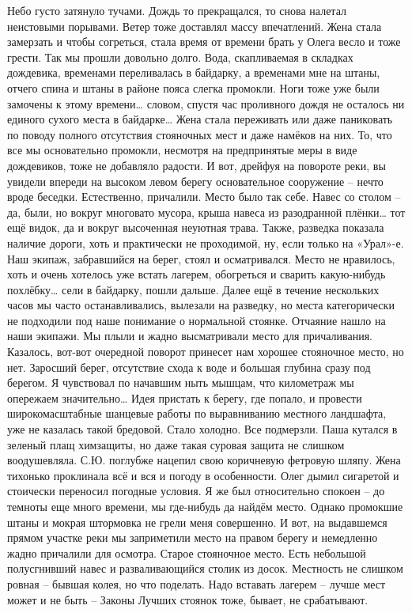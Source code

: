 Небо густо затянуло тучами. Дождь то прекращался, то снова налетал неистовыми порывами. Ветер тоже доставлял массу впечатлений. Жена стала замерзать и чтобы согреться, стала время от времени брать у Олега весло и тоже грести. Так мы прошли довольно долго. Вода, скапливаемая в складках дождевика, временами переливалась в байдарку, а временами мне на штаны, отчего спина и штаны в районе пояса слегка промокли. Ноги тоже уже были замочены к этому времени… словом, спустя час проливного дождя не осталось ни единого сухого места в байдарке… Жена стала переживать или даже паниковать по поводу полного отсутствия стояночных мест и даже намёков на них. То, что все мы основательно промокли, несмотря на предпринятые меры в виде дождевиков, тоже не добавляло радости.
И вот, дрейфуя на повороте реки, вы увидели впереди на высоком левом берегу основательное сооружение – нечто вроде беседки. Естественно, причалили. Место было так себе. Навес со столом – да, были, но вокруг многовато мусора, крыша навеса из разодранной плёнки… тот ещё видок, да и вокруг высоченная неуютная трава. Также, разведка показала наличие дороги, хоть и практически не проходимой, ну, если только на «Урал»-е. Наш экипаж, забравшийся на берег, стоял и осматривался. Место не нравилось, хоть и очень хотелось уже встать лагерем, обогреться и сварить какую-нибудь похлёбку… сели в байдарку, пошли дальше.
Далее ещё в течение нескольких часов мы часто останавливались, вылезали на разведку, но места категорически не подходили под наше понимание о нормальной стоянке. Отчаяние нашло на наши экипажи. Мы плыли и жадно высматривали место для причаливания. Казалось, вот-вот очередной поворот принесет нам хорошее стояночное место, но нет. Заросший берег, отсутствие схода к воде и большая глубина сразу под берегом. Я чувствовал по начавшим ныть мышцам, что километраж мы опережаем значительно… Идея пристать к берегу, где попало, и провести широкомасштабные шанцевые работы по выравниванию местного ландшафта, уже не казалась такой бредовой.
Стало холодно. Все подмерзли. Паша кутался в зеленый плащ химзащиты, но даже такая суровая защита не слишком воодушевляла. С.Ю. поглубже нацепил свою коричневую фетровую шляпу. Жена тихонько проклинала всё и вся и погоду в особенности. Олег дымил сигаретой и стоически переносил погодные условия. Я же был относительно спокоен – до темноты еще много времени, мы где-нибудь да найдём место. Однако промокшие штаны и мокрая штормовка не грели меня совершенно.
И вот, на выдавшемся прямом участке реки мы заприметили место на правом берегу и немедленно жадно причалили для осмотра. Старое стояночное место. Есть небольшой полусгнивший навес и разваливающийся столик из досок. Местность не слишком ровная – бывшая колея, но что поделать. Надо вставать лагерем – лучше мест может и не быть – Законы Лучших стоянок тоже, бывает, не срабатывают.
